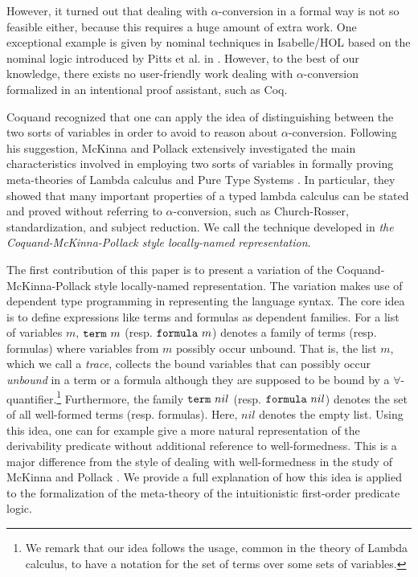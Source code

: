 \documentclass{kms-j}
\theoremstyle{plain}
\theoremstyle{remark}
\begin{document}
However, it turned out that dealing with $\alpha$-conversion in a formal way is not so feasible either,
because this requires a huge amount of extra work.
One exceptional example is given by nominal techniques in Isabelle/HOL
\citep{Urban2008} based on the nominal logic introduced by Pitts et al. in \citep{Gabbay2002,Pitts2003}.
However, to the best of our knowledge, there exists no user-friendly work dealing with $\alpha$-conversion
formalized in an intentional proof assistant, such as Coq.

Coquand \citep{Coquand1991} recognized that one can apply the idea of distinguishing between the two sorts of variables in order to avoid to reason about $\alpha$-conversion.
Following his suggestion, McKinna and Pollack extensively investigated
the main characteristics involved in employing two sorts of variables in formally proving meta-theories of Lambda calculus
and Pure Type Systems \citep{McKinna1993,McKinna1999}.
In particular, they showed that many important
properties of a typed lambda calculus can be stated and proved without
referring to $\alpha$-conversion, such as Church-Rosser, standardization, and subject reduction.
We call the technique developed in \cite{Coquand1991,McKinna1993,McKinna1999}
\textit{the Coquand-McKinna-Pollack style locally-named representation}.

The first contribution of this paper is to present a variation
of the Coquand-McKinna-Pollack style locally-named representation.
The variation makes use of dependent type programming
in representing the language syntax.
The core idea is to define expressions like terms and  formulas as dependent families.
For a list of variables $m$, $\textup{\tt term}\,\, m$ (resp. $\textup{\tt formula}\,\, m$) denotes a family of terms (resp. formulas)
where variables from $m$ possibly occur unbound.
That is, the list $m$, which we call a {\em trace},
collects the bound variables that can possibly occur \textit{unbound} in a term or a formula
although they are supposed to be bound by a $\forall$-quantifier.\footnote{
We remark that our idea follows the usage, common in the theory of Lambda calculus,
to have a notation for the set of terms over some sets of variables.}
%
Furthermore, the family $\textup{\tt term}\,\, nil$ (resp. $\textup{\tt formula}\,\, nil$) denotes the set of
all well-formed terms (resp. formulas). Here, $nil$ denotes the empty list.
Using this idea, one can for example give a more natural representation of
the derivability predicate without additional reference to well-formedness.
This is a major difference from the style of dealing with well-formedness
in the study of McKinna and Pollack \citep{McKinna1993,McKinna1999}.
We provide a full explanation of how this idea is applied to the formalization
of the meta-theory of the intuitionistic first-order predicate logic.
\end{document}

